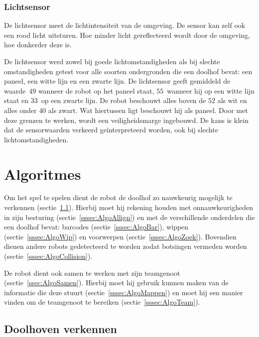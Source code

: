 \documentclass[eind]{penoverslag}
\begin{document}
\subsubsection{Lichtsensor}
De lichtsensor meet de lichtintensiteit van de omgeving. De sensor kan zelf ook een rood licht uitsturen. Hoe minder licht gereflecteerd wordt door de omgeving, hoe donkerder deze is.

De lichtsensor werd zowel bij goede lichtomstandigheden als bij slechte omstandigheden getest voor alle soorten ondergronden die een doolhof bevat: een paneel, een witte lijn en een zwarte lijn.
De lichtsensor geeft gemiddeld de waarde~$49$ wanneer de robot op het paneel staat, $55$~wanneer hij op een witte lijn staat en $33$~op een zwarte lijn. De robot beschouwt alles boven de $52$ als wit en alles onder $40$ als zwart. Wat hiertussen ligt beschouwt hij als paneel. Door met deze grenzen te werken, wordt een veiligheidsmarge ingebouwd. De kans is klein dat de sensorwaarden verkeerd ge\"interpreteerd worden, ook bij slechte lichtomstandigheden.


\newpage

\section{Algoritmes}
\label{sec:Algo}

Om het spel te spelen dient de robot de doolhof zo nauwkeurig mogelijk te verkennen (sectie~\ref{ssec:AlgoVerken}). Hierbij moet hij rekening houden met onnauwkeurigheden in zijn besturing (sectie~\ref{sssec:AlgoAllign}) en met de verschillende onderdelen die een doolhof bevat: barcodes (sectie~\ref{sssec:AlgoBar}), wippen (sectie~\ref{sssec:AlgoWip}) en voorwerpen (sectie~\ref{sssec:AlgoZoek}). Bovendien dienen andere robots gedetecteerd te worden zodat botsingen vermeden worden (sectie~\ref{sssec:AlgoCollision}).

De robot dient ook samen te werken met zijn teamgenoot (sectie~\ref{ssec:AlgoSamen}). Hierbij moet hij gebruik kunnen maken van de informatie die deze stuurt (sectie~\ref{sssec:AlgoMappen}) en moet hij een manier vinden om de teamgenoot te bereiken (sectie~\ref{sssec:AlgoTeam}).


\subsection{Doolhoven verkennen}
\label{ssec:AlgoVerken}
\end{document}
